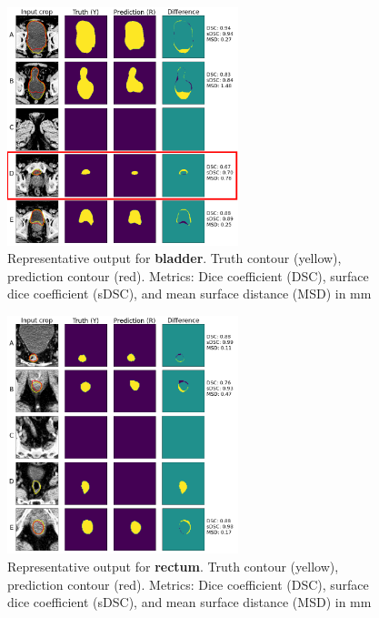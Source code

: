 \documentclass[9pt]{beamer}
\begin{document}
\begin{frame}{}
  \begin{figure}
    \includegraphics[width=0.60\textwidth]{images/prostate_bladder_worst}
    \caption{Representative output for \textbf{bladder}. Truth contour (yellow),
      prediction contour (red).
      Metrics: Dice coefficient (DSC), surface dice coefficient (sDSC), and mean
      surface distance (MSD) in mm}
  \end{figure}
\end{frame}
%
\begin{frame}{}
  \begin{figure}
    \includegraphics[width=0.60\textwidth]{images/prostate_rectum}
    \caption{Representative output for \textbf{rectum}. Truth contour (yellow),
      prediction contour (red).
      Metrics: Dice coefficient (DSC), surface dice coefficient (sDSC), and mean
      surface distance (MSD) in mm}
  \end{figure}
\end{frame}
\end{document}
